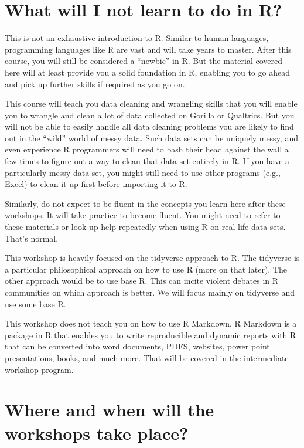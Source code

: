 \documentclass[
]{book}
\begin{document}
\hypertarget{what-will-i-not-learn-to-do-in-r}{%
\section{What will I not learn to do in R?}\label{what-will-i-not-learn-to-do-in-r}}

This is not an exhaustive introduction to R. Similar to human languages, programming languages like R are vast and will take years to master. After this course, you will still be considered a ``newbie'' in R. But the material covered here will at least provide you a solid foundation in R, enabling you to go ahead and pick up further skills if required as you go on.

This course will teach you data cleaning and wrangling skills that you will enable you to wrangle and clean a lot of data collected on Gorilla or Qualtrics. But you will not be able to easily handle all data cleaning problems you are likely to find out in the ``wild'' world of messy data. Such data sets can be uniquely messy, and even experience R programmers will need to bash their head against the wall a few times to figure out a way to clean that data set entirely in R. If you have a particularly messy data set, you might still need to use other programs (e.g., Excel) to clean it up first before importing it to R.

Similarly, do not expect to be fluent in the concepts you learn here after these workshops. It will take practice to become fluent. You might need to refer to these materials or look up help repeatedly when using R on real-life data sets. That's normal.

This workshop is heavily focused on the tidyverse approach to R. The tidyverse is a particular philosophical approach on how to use R (more on that later). The other approach would be to use base R. This can incite violent debates in R communities on which approach is better. We will focus mainly on tidyverse and use some base R.

This workshop does not teach you on how to use R Markdown. R Markdown is a package in R that enables you to write reproducible and dynamic reports with R that can be converted into word documents, PDFS, websites, power point presentations, books, and much more. That will be covered in the intermediate workshop program.

\hypertarget{where-and-when-will-the-workshops-take-place}{%
\section{Where and when will the workshops take place?}\label{where-and-when-will-the-workshops-take-place}}
\end{document}
